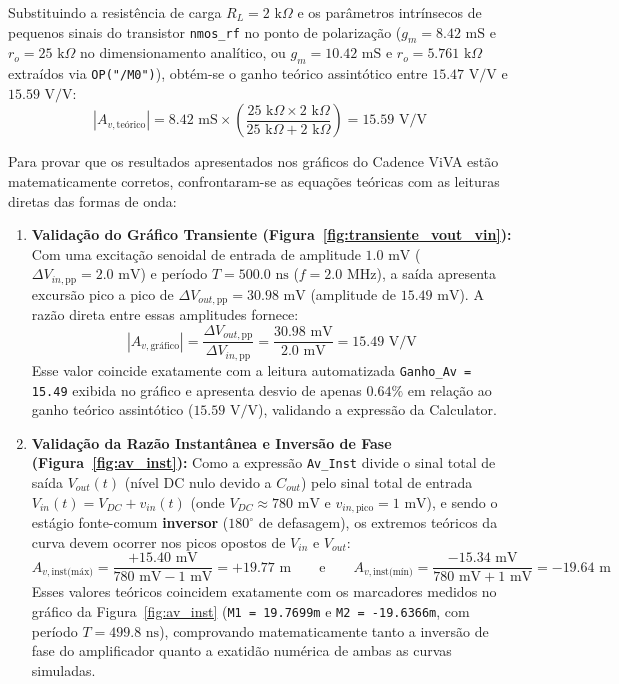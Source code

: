 Substituindo a resistência de carga $R_L = 2\text{ k}\Omega$ e os parâmetros intrínsecos de pequenos sinais do transistor \texttt{nmos\_rf} no ponto de polarização ($g_m = 8.42\text{ mS}$ e $r_o = 25\text{ k}\Omega$ no dimensionamento analítico, ou $g_m = 10.42\text{ mS}$ e $r_o = 5.761\text{ k}\Omega$ extraídos via \texttt{OP("/M0")}), obtém-se o ganho teórico assintótico entre $15.47\text{ V/V}$ e $15.59\text{ V/V}$:
\begin{equation}
    |A_{v,\text{teórico}}| = 8.42\text{ mS} \times \left(\frac{25\text{ k}\Omega \times 2\text{ k}\Omega}{25\text{ k}\Omega + 2\text{ k}\Omega}\right) = 15.59\text{ V/V}
\end{equation}

Para provar que os resultados apresentados nos gráficos do Cadence ViVA estão matematicamente corretos, confrontaram-se as equações teóricas com as leituras diretas das formas de onda:
\begin{enumerate}
    \item \textbf{Validação do Gráfico Transiente (Figura~\ref{fig:transiente_vout_vin}):} Com uma excitação senoidal de entrada de amplitude $1.0\text{ mV}$ ($\Delta V_{in,\text{pp}} = 2.0\text{ mV}$) e período $T = 500.0\text{ ns}$ ($f = 2.0\text{ MHz}$), a saída apresenta excursão pico a pico de $\Delta V_{out,\text{pp}} = 30.98\text{ mV}$ (amplitude de $15.49\text{ mV}$). A razão direta entre essas amplitudes fornece:
    \begin{equation}
        |A_{v,\text{gráfico}}| = \frac{\Delta V_{out,\text{pp}}}{\Delta V_{in,\text{pp}}} = \frac{30.98\text{ mV}}{2.0\text{ mV}} = 15.49\text{ V/V}
    \end{equation}
    Esse valor coincide exatamente com a leitura automatizada \texttt{Ganho\_Av = 15.49} exibida no gráfico e apresenta desvio de apenas $0.64\%$ em relação ao ganho teórico assintótico ($15.59\text{ V/V}$), validando a expressão da Calculator.

    \item \textbf{Validação da Razão Instantânea e Inversão de Fase (Figura~\ref{fig:av_inst}):} Como a expressão \texttt{Av\_Inst} divide o sinal total de saída $V_{out}(t)$ (nível DC nulo devido a $C_{out}$) pelo sinal total de entrada $V_{in}(t) = V_{DC} + v_{in}(t)$ (onde $V_{DC} \approx 780\text{ mV}$ e $v_{in,\text{pico}} = 1\text{ mV}$), e sendo o estágio fonte-comum \textbf{inversor} ($180^\circ$ de defasagem), os extremos teóricos da curva devem ocorrer nos picos opostos de $V_{in}$ e $V_{out}$:
    \begin{equation}
        A_{v,\text{inst(máx)}} = \frac{+15.40\text{ mV}}{780\text{ mV} - 1\text{ mV}} = +19.77\text{ m} \qquad \text{e} \qquad A_{v,\text{inst(mín)}} = \frac{-15.34\text{ mV}}{780\text{ mV} + 1\text{ mV}} = -19.64\text{ m}
    \end{equation}
    Esses valores teóricos coincidem exatamente com os marcadores medidos no gráfico da Figura~\ref{fig:av_inst} (\texttt{M1 = 19.7699m} e \texttt{M2 = -19.6366m}, com período $T = 499.8\text{ ns}$), comprovando matematicamente tanto a inversão de fase do amplificador quanto a exatidão numérica de ambas as curvas simuladas.
\end{enumerate}

